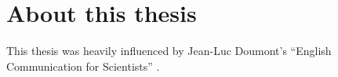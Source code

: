 \chapter{About this thesis}

This thesis was heavily influenced by Jean-Luc Doumont's \enquote{English Communication for Scientists} .
